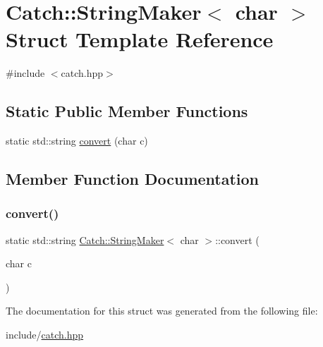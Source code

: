 \hypertarget{struct_catch_1_1_string_maker_3_01char_01_4}{}\section{Catch\+::String\+Maker$<$ char $>$ Struct Template Reference}
\label{struct_catch_1_1_string_maker_3_01char_01_4}


{\ttfamily \#include $<$catch.\+hpp$>$}

\subsection*{Static Public Member Functions}
\begin{DoxyCompactItemize}
\item 
static std\+::string \mbox{\hyperlink{struct_catch_1_1_string_maker_3_01char_01_4_a4e3db69a12bb83f3ef89251893e65da5}{convert}} (char c)
\end{DoxyCompactItemize}


\subsection{Member Function Documentation}
\mbox{\label{struct_catch_1_1_string_maker_3_01char_01_4_a4e3db69a12bb83f3ef89251893e65da5}} 
\subsubsection{\texorpdfstring{convert()}{convert()}}
{\footnotesize\ttfamily static std\+::string \mbox{\hyperlink{struct_catch_1_1_string_maker}{Catch\+::\+String\+Maker}}$<$ char $>$\+::convert (\begin{DoxyParamCaption}\item[{char}]{c }\end{DoxyParamCaption})\hspace{0.3cm}{\ttfamily [static]}}



The documentation for this struct was generated from the following file\+:\begin{DoxyCompactItemize}
\item 
include/\mbox{\hyperlink{catch_8hpp}{catch.\+hpp}}\end{DoxyCompactItemize}
